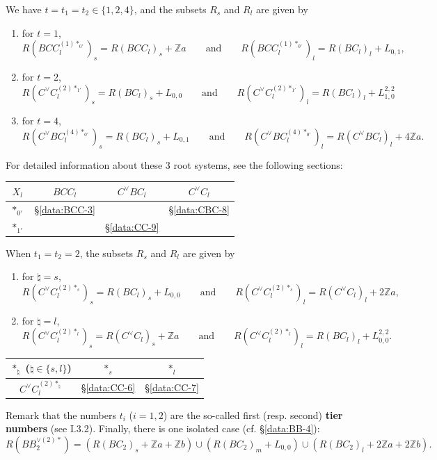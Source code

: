 \documentclass[11pt]{amsart}
\newcommand{\Z}{\mathbb{Z}}
\begin{document}
 \hskip 0.1in 
We have $t=t_1=t_2 \in \{1,2,4\}$, and the subsets $R_s$ and $R_l$  are given by
\begin{enumerate}
\item for $t=1$,
\[ R(BCC_l^{(1)\ast_{0'}})_s=R(BCC_l)_s+\Z a \qquad \text{and} \qquad R(BCC_l^{(1)\ast_{0'}})_l=R(BC_l)_l+L_{0,1}, \]
\item for $t=2$,
\[ R(C^\vee C_l^{(2)\ast_{1'}})_s=R(BC_l)_s+L_{0,0} \qquad \text{and} \qquad 
R(C^\vee C_l^{(2)\ast_{1'}})_l=R(BC_l)_l+L_{1,0}^{2,2} \]
\item for $t=4$, 
\[ R(C^\vee BC_l^{(4)\ast_{0'}})_s=R(BC_l)_s+L_{0,1} \qquad \text{and} \qquad
   R(C^\vee BC_l^{(4)\ast_{0'}})_l=R(C^\vee BC_l)_l+4\Z a.  \]
\end{enumerate}
For detailed information about these $3$ root systems, see the following sections: \\
\begin{center}
\begin{tabular}{|c||c|c|c|} \hline
$X_l$ &  $BCC_l$ & $C^\vee BC_l$ & $C^\vee C_l$  \\ \hline
$\ast_{0'}$ &\S \ref{data:BCC-3} & & \S \ref{data:CBC-8}\\ \hline
$\ast_{1'}$ & &\S \ref{data:CC-9} & \\ \hline
\end{tabular}
\end{center}

\vskip 0.2in 

 \hskip 0.1in 
When $t_1=t_2=2$,  the subsets $R_s$ and $R_l$  are given by
\begin{enumerate}
\item for $\natural=s$,
\[ R(C^\vee C_l^{(2)\ast_{s}})_s=R(BC_l)_s+L_{0,0}  \qquad \text{and} \qquad
   R(C^\vee C_l^{(2)\ast_{s}})_l=R(C^\vee C_l)_l+2\Z a, \]
\item for $\natural=l$,
\[  R(C^\vee C_l^{(2)\ast_{l}})_s=R(C^\vee C_l)_s+\Z a \qquad \text{and} \qquad 
    R(C^\vee C_l^{(2)\ast_{l}})_l=R(BC_l)_l+L_{0,0}^{2,2}. \]
\end{enumerate}
\begin{center}
\begin{tabular}{|c||c|c|} \hline
$\ast_\natural$ ($\natural \in \{s,l\}$) &  $\ast_s$ & $\ast_l$  \\ \hline
$C^\vee C_l^{(2)\ast_\natural}$ &\S \ref{data:CC-6} &  \S \ref{data:CC-7}\\ \hline
\end{tabular}
\end{center}
\vskip 0.2in
Remark that the numbers $t_i$ ($i=1,2$) are the so-called first (resp. second) \textbf{tier numbers} (see I.3.2). Finally, there is one isolated case (cf. \S \ref{data:BB-4}):
\[ R(BB_2^{\vee (2)\ast})=(R(BC_2)_s+\Z a+\Z b) \cup (R(BC_2)_m+L_{0,0}) \cup (R(BC_2)_l+2\Z a+2\Z b). \]
\end{document}

